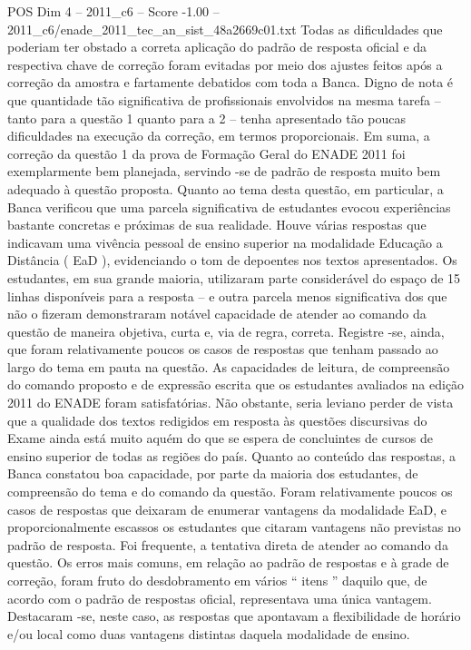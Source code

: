 \begin{textsample}{POS Dim 4 – 2011\_c6 – Score -1.00 – 2011\_c6/enade\_2011\_tec\_an\_sist\_48a2669c01.txt}
Todas as dificuldades que poderiam ter obstado a correta aplicação do padrão de resposta oficial e da respectiva chave de correção foram evitadas por meio dos ajustes feitos após a correção da amostra e fartamente debatidos com toda a Banca.
Digno de nota é que quantidade tão significativa de profissionais envolvidos na mesma tarefa – tanto para a questão 1 quanto para a 2 – tenha apresentado tão poucas dificuldades na execução da correção, em termos proporcionais.
Em suma, a correção da questão 1 da prova de Formação Geral do ENADE 2011 foi exemplarmente bem planejada, servindo -se de padrão de resposta muito bem adequado à questão proposta.
Quanto ao tema desta questão, em particular, a Banca verificou que uma parcela significativa de estudantes evocou experiências bastante concretas e próximas de sua realidade.
Houve várias respostas que indicavam uma vivência pessoal de ensino superior na modalidade Educação a Distância ( EaD ), evidenciando o tom de depoentes nos textos apresentados.
Os estudantes, em sua grande maioria, utilizaram parte considerável do espaço de 15 linhas disponíveis para a resposta – e outra parcela menos significativa dos que não o fizeram demonstraram notável capacidade de atender ao comando da questão de maneira objetiva, curta e, via de regra, correta.
Registre -se, ainda, que foram relativamente poucos os casos de respostas que tenham passado ao largo do tema em pauta na questão.
As capacidades de leitura, de compreensão do comando proposto e de expressão escrita que os estudantes avaliados na edição 2011 do ENADE foram satisfatórias.
Não obstante, seria leviano perder de vista que a qualidade dos textos redigidos em resposta às questões discursivas do Exame ainda está muito aquém do que se espera de concluintes de cursos de ensino superior de todas as regiões do país.
Quanto ao conteúdo das respostas, a Banca constatou boa capacidade, por parte da maioria dos estudantes, de compreensão do tema e do comando da questão.
Foram relativamente poucos os casos de respostas que deixaram de enumerar vantagens da modalidade EaD, e proporcionalmente escassos os estudantes que citaram vantagens não previstas no padrão de resposta.
Foi frequente, a tentativa direta de atender ao comando da questão.
Os erros mais comuns, em relação ao padrão de respostas e à grade de correção, foram fruto do desdobramento em vários “ itens ” daquilo que, de acordo com o padrão de respostas oficial, representava uma única vantagem.
Destacaram -se, neste caso, as respostas que apontavam a flexibilidade de horário e/ou local como duas vantagens distintas daquela modalidade de ensino.

\end{textsample}
